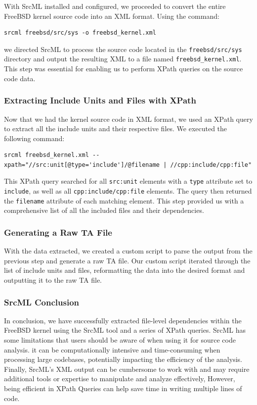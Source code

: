 \documentclass[12pt, dvipsnames, a4paper]{article}
\begin{document}
With SrcML installed and configured, we proceeded to convert the entire FreeBSD kernel source code into an XML format. Using the command:

\begin{verbatim}
srcml freebsd/src/sys -o freebsd_kernel.xml
\end{verbatim}

we directed SrcML to process the source code located in the \texttt{freebsd/src/sys} directory and output the resulting XML to a file named \texttt{freebsd\_kernel.xml}. This step was essential for enabling us to perform XPath queries on the source code data.

\subsubsection{Extracting Include Units and Files with XPath}

Now that we had the kernel source code in XML format, we used an XPath query to extract all the include units and their respective files. We executed the following command:

\begin{verbatim}
srcml freebsd_kernel.xml --xpath="//src:unit[@type='include']/@filename | //cpp:include/cpp:file"
\end{verbatim}

This XPath query searched for all \texttt{src:unit} elements with a \texttt{type} attribute set to \texttt{include}, as well as all \texttt{cpp:include/cpp:file} elements. The query then returned the \texttt{filename} attribute of each matching element. This step provided us with a comprehensive list of all the included files and their dependencies.

\subsubsection{Generating a Raw TA File}

With the data extracted, we created a custom script to parse the output from the previous step and generate a raw TA file.  Our custom script iterated through the list of include units and files, reformatting the data into the desired format and outputting it to the raw TA file.

\subsubsection{SrcML Conclusion}

In conclusion, we have successfully extracted file-level dependencies within the FreeBSD kernel using the SrcML tool and a series of XPath queries. SrcML has some limitations that users should be aware of when using it for source code analysis. it can be computationally intensive and time-consuming when processing large codebases, potentially impacting the efficiency of the analysis. Finally, SrcML's XML output can be cumbersome to work with and may require additional tools or expertise to manipulate and analyze effectively, However, being efficient in XPath Queries can help save time in writing multiple lines of code.
\end{document}
